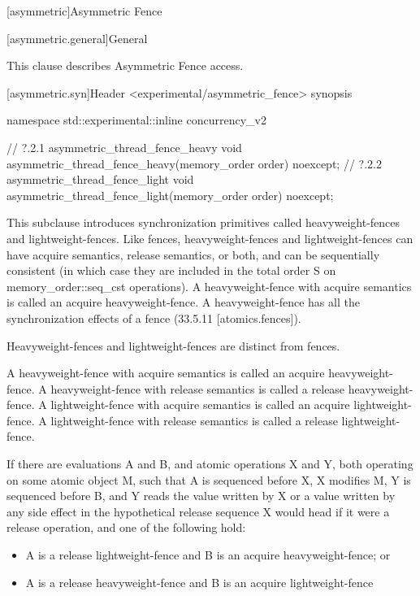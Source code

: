 
[asymmetric]{Asymmetric Fence}

[asymmetric.general]{General}

This clause describes Asymmetric Fence access. 


[asymmetric.syn]{Header <experimental/asymmetric_fence> synopsis}


\begin{codeblock}
namespace std::experimental::inline concurrency_v2 {


// ?.2.1 asymmetric_thread_fence_heavy
void asymmetric_thread_fence_heavy(memory_order order) noexcept;
// ?.2.2 asymmetric_thread_fence_light
void asymmetric_thread_fence_light(memory_order order) noexcept;


}
\end{codeblock}

\pnum

This subclause introduces synchronization primitives called heavyweight-fences and
lightweight-fences. Like fences, heavyweight-fences and lightweight-fences can have acquire
semantics, release semantics, or both, and can be sequentially consistent (in which case they
are included in the total order S on memory\_order::seq\_cst operations). A heavyweight-fence
with acquire semantics is called an acquire heavyweight-fence. A heavyweight-fence has all the
synchronization effects of a fence (33.5.11 [atomics.fences]). \begin{note}  Heavyweight-fences and
lightweight-fences are distinct from fences. \end{note}

\pnum
A heavyweight-fence with acquire semantics is called an acquire heavyweight-fence. A
heavyweight-fence with release semantics is called a release heavyweight-fence. A
lightweight-fence with acquire semantics is called an acquire lightweight-fence. A
lightweight-fence with release semantics is called a release lightweight-fence.

\pnum
If there are evaluations A and B, and atomic operations X and Y, both operating on some atomic
object M, such that A is sequenced before X, X modifies M, Y is sequenced before B, and Y
reads the value written by X or a value written by any side effect in the hypothetical release
sequence X would head if it were a release operation, and one of the following hold:
\begin{itemize}
    \item  A is a release lightweight-fence and B is an acquire heavyweight-fence; or
\item  A is a release heavyweight-fence and B is an acquire lightweight-fence
\end{itemize}

